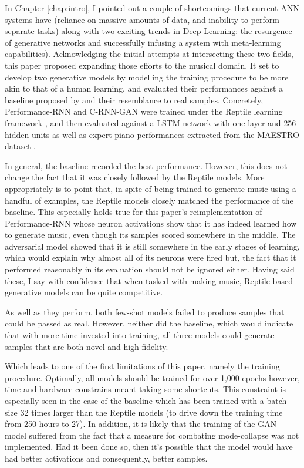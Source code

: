 \documentclass[a4paper]{book}
\begin{document}
In Chapter \ref{chap:intro}, I pointed out a couple of shortcomings that current ANN systems have (reliance on massive amounts of data, and inability to perform separate tasks) along with two exciting trends in Deep Learning: the resurgence of generative networks and successfully infusing a system with meta-learning capabilities). Acknowledging the initial attempts at intersecting these two fields, this paper proposed expanding those efforts to the musical domain. It set to develop two generative models by modelling the training procedure to be more akin to that of a human learning, and evaluated their performances against a baseline proposed by \textcite{larochelle_few-shot_2017} and their resemblance to real samples. Concretely, Performance-RNN \parencite{oore_this_2018} and C-RNN-GAN \parencite{mogren_c-rnn-gan_2016} were trained under the Reptile learning framework \parencite{nichol_first-order_2018}, and then evaluated against a LSTM network with one layer and 256 hidden units as well as expert piano performances extracted from the MAESTRO dataset \parencite{hawthorne_enabling_2018}.

In general, the baseline recorded the best performance. However, this does not change the fact that it was closely followed by the Reptile models. More appropriately is to point that, in spite of being trained to generate music using a handful of examples, the Reptile models closely matched the performance of the baseline. This especially holds true for this paper's reimplementation of Performance-RNN whose neuron activations show that it has indeed learned how to generate music, even though its samples scored somewhere in the middle. The adversarial model showed that it is still somewhere in the early stages of learning, which would explain why almost all of its neurons were fired but, the fact that it performed reasonably in its evaluation should not be ignored either. Having said these, I say with confidence that when tasked with making music, Reptile-based generative models can be quite competitive.

As well as they perform, both few-shot models failed to produce samples that could be passed as real. However, neither did the baseline, which would indicate that with more time invested into training, all three models could generate samples that are both novel and high fidelity.

Which leads to one of the first limitations of this paper, namely the training procedure. Optimally, all models should be trained for over 1,000 epochs however, time and hardware constrains meant taking some shortcuts. This constraint is especially seen in the case of the baseline which has been trained with a batch size 32 times larger than the Reptile models (to drive down the training time from 250 hours to 27). In addition, it is likely that the training of the GAN model suffered from the fact that a measure for combating mode-collapse was not implemented. Had it been done so, then it's possible that the model would have had better activations and consequently, better samples.
\end{document}
